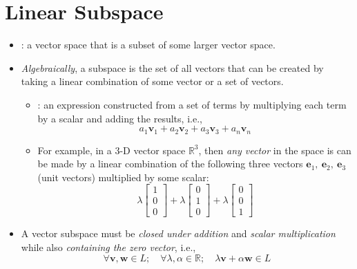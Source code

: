\section{Linear Subspace}\label{Linear Subspace}
\begin{itemize}
  \item {}: a vector space that is a subset of some larger vector space.
  \item \emph{Algebraically}, a subspace is the set of all vectors that can be created by taking a linear combination of some vector or a set of vectors.
    \begin{itemize}
      \item {}: an expression constructed from a set of terms by multiplying each term by a scalar and adding the results, i.e.,
      \[%
      a_1\bm{v}_1 +  a_2\bm{v}_2 +  a_3\bm{v}_3 +  a_n\bm{v}_n   
      \]%
      \item For example, in a 3-D vector space \(\mathbb{R}^3\), then \emph{any vector} in the space is can be made by a linear combination of the following three vectors \(\bm{e}_1,~\bm{e}_2,~\bm{e}_3\) (unit vectors) multiplied by some scalar:
      \[%
      \lambda\begin{bmatrix} 1 \\ 0 \\ 0 \end{bmatrix} +
      \lambda\begin{bmatrix} 0 \\ 1 \\ 0 \end{bmatrix} + 
      \lambda\begin{bmatrix} 0 \\ 0 \\ 1 \end{bmatrix}
      \]%
    \end{itemize}
  \item A vector subspace must be \emph{closed under} \emph{addition} and \emph{scalar multiplication} while also \emph{containing the zero vector}, i.e.,
  \[%
  \forall\bm{v}, \bm{w} \in L;\quad \forall\lambda,\alpha \in \mathbb{R};\quad \lambda \bm{v} + \alpha \bm{w} \in L
  \]%
    \begin{itemize}

\end{itemize}
\end{itemize}
